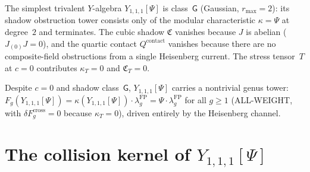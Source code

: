   \begin{remark}%
\label{rem:y111-class-g}
The simplest trivalent $Y$-algebra $Y_{1,1,1}[\Psi]$ is
class~$\mathsf{G}$ (Gaussian, $r_{\max} = 2$):
its shadow obstruction tower consists only of the
modular characteristic $\kappa = \Psi$ at degree~$2$ and
terminates. The cubic shadow $\mathfrak{C}$ vanishes because
$J$ is abelian ($J_{(0)}J = 0$), and the quartic contact
$Q^{\mathrm{contact}}$ vanishes because there are no composite-field
obstructions from a single Heisenberg current. The stress
tensor~$T$ at $c = 0$ contributes $\kappa_T = 0$ and
$\mathfrak{C}_T = 0$.

Despite $c = 0$ and shadow class~$\mathsf{G}$,
$Y_{1,1,1}[\Psi]$ carries a nontrivial genus tower:
$F_g(Y_{1,1,1}[\Psi])
 = \kappa(Y_{1,1,1}[\Psi]) \cdot \lambda_g^{\mathrm{FP}}
 = \Psi \cdot \lambda_g^{\mathrm{FP}}$
for all $g \geq 1$ \textup{(}ALL-WEIGHT, with
$\delta F_g^{\mathrm{cross}} = 0$ because $\kappa_T = 0$\textup{)},
driven entirely by the Heisenberg channel.
\end{remark}


\section{The collision kernel of $Y_{1,1,1}[\Psi]$}%
\label{sec:y111-r-matrix}

